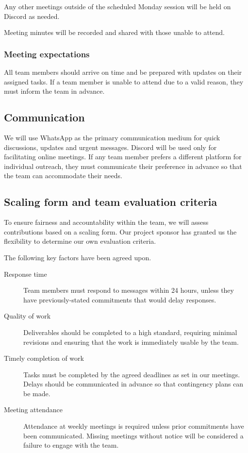 \documentclass{scrartcl}
\begin{document}
\par
Any other meetings outside of the scheduled Monday session will be held on Discord \parencite{discord} as needed.

\par
Meeting minutes will be recorded and shared with those unable to attend.


\subsubsection{Meeting expectations}
All team members should arrive on time and be prepared with updates on their assigned tasks.
If a team member is unable to attend due to a valid reason, they must inform the team in advance.

\subsection{Communication}
We will use WhatsApp \parencite{whatsapp} as the primary communication medium for quick discussions, updates and urgent messages.
Discord \parencite{discord} will be used only for facilitating online meetings.
If any team member prefers a different platform for individual outreach, they must communicate their preference in advance so that the team can accommodate their needs.

\subsection{Scaling form and team evaluation criteria}
To ensure fairness and accountability within the team, we will assess contributions based on a scaling form.
Our project sponsor has granted us the flexibility to determine our own evaluation criteria.

\par
The following key factors have been agreed upon.

\begin{description}
\item[Response time] Team members must respond to messages within 24 hours, unless they have previously-stated commitments that would delay responses.
\item[Quality of work] Deliverables should be completed to a high standard, requiring minimal revisions and ensuring that the work is immediately usable by the team.
\item[Timely completion of work] Tasks must be completed by the agreed deadlines as set in our meetings. Delays should be communicated in advance so that contingency plans can be made.
\item[Meeting attendance] Attendance at weekly meetings is required unless prior commitments have been communicated. Missing meetings without notice will be considered a failure to engage with the team.
\end{description}
\end{document}
